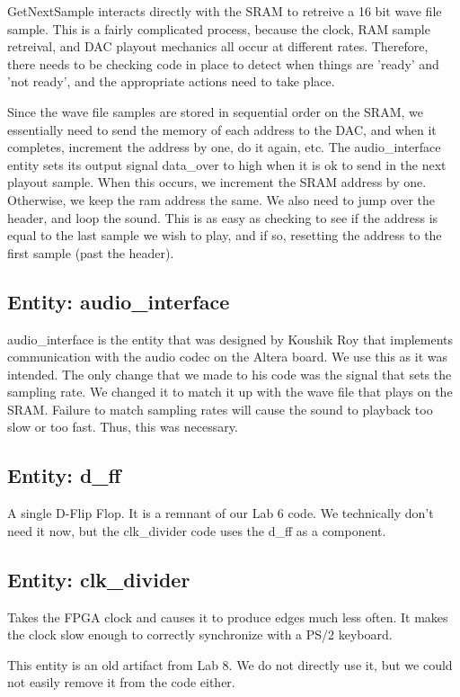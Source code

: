 \documentclass[10pt,a4paper]{article}
\begin{document}
GetNextSample interacts directly with the SRAM to retreive a 16 bit wave file sample. This is a fairly complicated process, because the clock, RAM sample retreival, and DAC playout mechanics all occur at different rates. Therefore, there needs to be checking code in place to detect when things are 'ready' and 'not ready', and the appropriate actions need to take place.

Since the wave file samples are stored in sequential order on the SRAM, we essentially need to send the memory of each address to the DAC, and when it completes, increment the address by one, do it again, etc. The audio\_interface entity sets its output signal data\_over to high when it is ok to send in the next playout sample. When this occurs, we increment the SRAM address by one. Otherwise, we keep the ram address the same. We also need to jump over the header, and loop the sound. This is as easy as checking to see if the address is equal to the last sample we wish to play, and if so, resetting the address to the first sample (past the header).

\subsection{Entity: audio\_interface}
audio\_interface is the entity that was designed by Koushik Roy that implements communication with the audio codec on the Altera board. We use this as it was intended. The only change that we made to his code was the signal that sets the sampling rate. We changed it to match it up with the
wave file that plays on the SRAM. Failure to match sampling rates will cause the sound to playback too slow or too fast. Thus, this was necessary.
\subsection{Entity: d\_ff}
A single D-Flip Flop. It is a remnant of our Lab 6 code. We technically don't need it now, but the clk\_divider code uses the d\_ff as a component.

\subsection{Entity: clk\_divider}
Takes the FPGA clock and causes it to produce edges much less often. It makes the clock slow enough to correctly synchronize with a PS/2 keyboard.

This entity is an old artifact from Lab 8. We do not directly use it, but we could not easily remove it from the code either.
\end{document}
